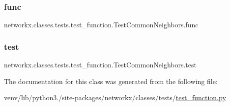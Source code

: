 \subsubsection{\texorpdfstring{func}{func}}
{\footnotesize\ttfamily networkx.\+classes.\+tests.\+test\+\_\+function.\+Test\+Common\+Neighbors.\+func}

\mbox{\label{classnetworkx_1_1classes_1_1tests_1_1test__function_1_1TestCommonNeighbors_a64be16d951883abf3f6c2c75bcba752e}} 
\subsubsection{\texorpdfstring{test}{test}}
{\footnotesize\ttfamily networkx.\+classes.\+tests.\+test\+\_\+function.\+Test\+Common\+Neighbors.\+test}



The documentation for this class was generated from the following file\+:\begin{DoxyCompactItemize}
\item 
venv/lib/python3./site-\/packages/networkx/classes/tests/\hyperlink{test__function_8py}{test\+\_\+function.\+py}\end{DoxyCompactItemize}
